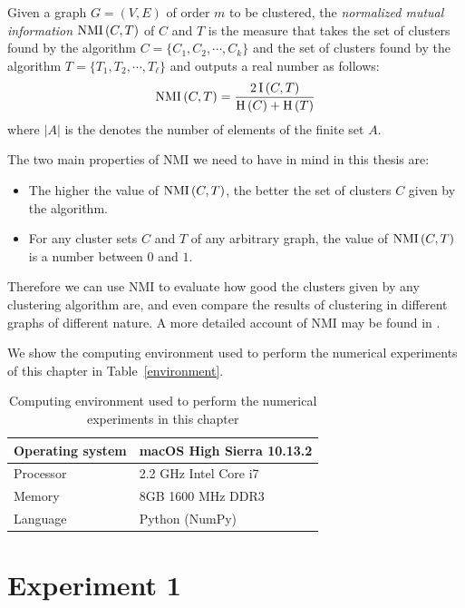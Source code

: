 \begin{definition}
   Given a graph $G = (V,E)$ of order $m$ to be clustered, the \textit{normalized mutual information} $\operatorname{NMI\,} (C, T)$ of $C$ and $T$ is the measure that takes the set of clusters found by the algorithm $C = \{ C_1, C_2, \cdots, C_k \}$ and the set of clusters found by the algorithm $T = \{ T_1, T_2, \cdots, T_\ell \}$ and outputs a real number as follows:
\begin{equation}
   \operatorname{NMI\,} (C,T) = \frac{2\operatorname{I\,} (C,T)}{\operatorname{H\,} (C) + \operatorname{H\,} (T)}
\end{equation}
where $|A|$ is the denotes the number of elements of the finite set $A$.
\end{definition}

The two main properties of NMI we need to have in mind in this thesis are:

\begin{itemize}
   \item The higher the value of $\operatorname{NMI\,} (C,T)$, the better the set of clusters $C$ given by the algorithm.
   \item For any cluster sets $C$ and $T$ of any arbitrary graph, the value of $\operatorname{NMI\,} (C,T)$ is a number between $0$ and $1$. 
\end{itemize}

Therefore we can use NMI to evaluate how good the clusters given by any clustering algorithm are, and even compare the results of clustering in different graphs of different nature.
A more detailed account of NMI may be found in \cite{nmi}.

We show the computing environment used to perform the numerical experiments of this chapter in Table~\vref{environment}.

\begin{table}[h]
\centering
   \caption[Computing environment]{Computing environment used to perform the numerical experiments in this chapter}
\label{environment}
\begin{tabular}{l|l}
\hline
Operating system & macOS High Sierra 10.13.2 \\ \hline
Processor        & 2.2 GHz Intel Core i7     \\ \hline
Memory           & 8GB 1600 MHz DDR3         \\ \hline
Language         & Python (NumPy)            \\ \hline
\end{tabular}
\end{table}

\section{Experiment 1}
